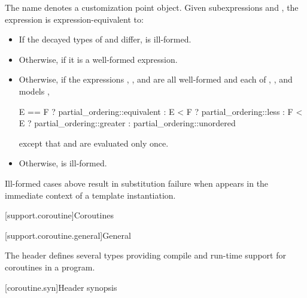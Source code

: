 %
\pnum
The name  denotes
a customization point object.
Given subexpressions  and ,
the expression 
is expression-equivalent to:
\begin{itemize}
\item
  If the decayed types of  and  differ,
   is ill-formed.
\item
  Otherwise,  if it is a well-formed expression.
\item
  Otherwise, if the expressions
  , , and 
  are all well-formed and
  each of , , and
   models
  ,
\begin{codeblock}
E == F ? partial_ordering::equivalent :
E < F  ? partial_ordering::less :
F < E  ? partial_ordering::greater :
         partial_ordering::unordered
\end{codeblock}
except that  and  are evaluated only once.
\item
  Otherwise,  is ill-formed.
\end{itemize}

\begin{note}
Ill-formed cases above result in substitution failure
when  appears in the immediate context
of a template instantiation.
\end{note}

[support.coroutine]{Coroutines}

[support.coroutine.general]{General}

\pnum
The header 
defines several types providing
compile and run-time support for
coroutines in a \Cpp{} program.

[coroutine.syn]{Header  synopsis}

